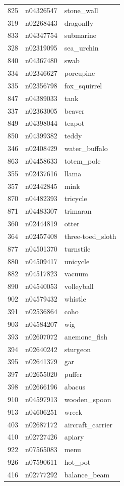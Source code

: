 \begin{table}
\begin{tabular}{cll}
825 & n04326547 & stone_wall \\
319 & n02268443 & dragonfly \\
833 & n04347754 & submarine \\
328 & n02319095 & sea_urchin \\
840 & n04367480 & swab \\
334 & n02346627 & porcupine \\
335 & n02356798 & fox_squirrel \\
847 & n04389033 & tank \\
337 & n02363005 & beaver \\
849 & n04398044 & teapot \\
850 & n04399382 & teddy \\
346 & n02408429 & water_buffalo \\
863 & n04458633 & totem_pole \\
355 & n02437616 & llama \\
357 & n02442845 & mink \\
870 & n04482393 & tricycle \\
871 & n04483307 & trimaran \\
360 & n02444819 & otter \\
364 & n02457408 & three-toed_sloth \\
877 & n04501370 & turnstile \\
880 & n04509417 & unicycle \\
882 & n04517823 & vacuum \\
890 & n04540053 & volleyball \\
902 & n04579432 & whistle \\
391 & n02536864 & coho \\
903 & n04584207 & wig \\
393 & n02607072 & anemone_fish \\
394 & n02640242 & sturgeon \\
395 & n02641379 & gar \\
397 & n02655020 & puffer \\
398 & n02666196 & abacus \\
910 & n04597913 & wooden_spoon \\
913 & n04606251 & wreck \\
403 & n02687172 & aircraft_carrier \\
410 & n02727426 & apiary \\
922 & n07565083 & menu \\
926 & n07590611 & hot_pot \\
416 & n02777292 & balance_beam \\

\end{tabular}
\end{table}

